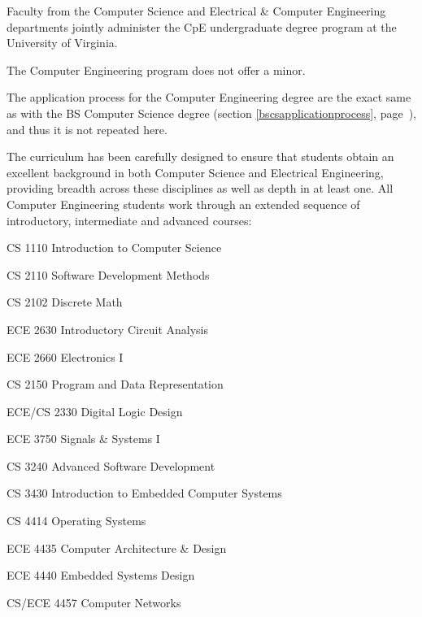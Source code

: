 Faculty from the Computer Science and Electrical \& Computer
Engineering departments jointly administer the CpE undergraduate
degree program at the University of Virginia.

The Computer Engineering program does not offer a minor.


\label{bscpeapplicationprocess}

The application process for the Computer Engineering degree are the
exact same as with the BS Computer Science degree (section
\ref{bscsapplicationprocess}, page~\pageref{bscsapplicationprocess}),
and thus it is not repeated here.



The curriculum has been carefully designed to ensure that students
obtain an excellent background in both Computer Science and Electrical
Engineering, providing breadth across these disciplines as well as
depth in at least one. All Computer Engineering students work through
an extended sequence of introductory, intermediate and advanced
courses:

\begin{itemlist}
\item CS 1110 Introduction to Computer Science
\item CS 2110 Software Development Methods
\item CS 2102 Discrete Math
\item ECE 2630 Introductory Circuit Analysis
\item ECE 2660 Electronics I
\item CS 2150 Program and Data Representation
\item ECE/CS 2330 Digital Logic Design
\item ECE 3750 Signals \& Systems I
\item CS 3240 Advanced Software Development
\item CS 3430 Introduction to Embedded Computer Systems
\item CS 4414 Operating Systems
\item ECE 4435 Computer Architecture \& Design
\item ECE 4440 Embedded Systems Design
\item CS/ECE 4457 Computer Networks
\end{itemlist}


